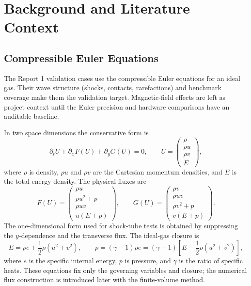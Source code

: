 
\chapter{Background and Literature Context}

\section{Compressible Euler Equations}
The Report 1 validation cases use the compressible Euler equations for an
ideal gas. Their wave structure (shocks, contacts, rarefactions) and benchmark coverage \citep{toro2009,liska_wendroff_2003} make them the validation target. Magnetic-field effects are left as project context until the Euler precision and hardware comparisons have an auditable baseline.

In two space dimensions the conservative form is
\begin{equation}
  \partial_t U + \partial_x F(U) + \partial_y G(U) = 0,
  \qquad
  U =
  \begin{pmatrix}
    \rho\\ \rho u\\ \rho v\\ E
  \end{pmatrix},
\end{equation}
where \(\rho\) is density, \(\rho u\) and \(\rho v\) are the Cartesian momentum
densities, and \(E\) is the total energy density. The physical fluxes are
\begin{equation}
  F(U)=
  \begin{pmatrix}
    \rho u\\ \rho u^2+p\\ \rho uv\\ u(E+p)
  \end{pmatrix},
  \qquad
  G(U)=
  \begin{pmatrix}
    \rho v\\ \rho uv\\ \rho v^2+p\\ v(E+p)
  \end{pmatrix}.
\end{equation}
The one-dimensional form used for shock-tube tests is obtained by suppressing
the \(y\)-dependence and the transverse flux. The ideal-gas closure is
\begin{equation}
  E = \rho e + \frac{1}{2}\rho\left(u^2+v^2\right),
  \qquad
  p = (\gamma-1)\rho e
    = (\gamma-1)\left[E-\frac{1}{2}\rho\left(u^2+v^2\right)\right],
\end{equation}
where \(e\) is the specific internal energy, \(p\) is pressure, and
\(\gamma\) is the ratio of specific heats. These equations fix only the
governing variables and closure; the numerical flux construction is introduced later
with the finite-volume method.

